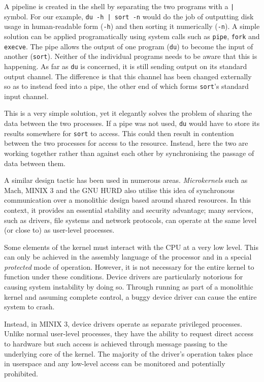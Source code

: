 A pipeline is created in the shell by separating the two programs with
a \texttt{|} symbol.  For our example, \texttt{du -h | sort -n} would
do the job of outputting disk usage in human-readable form
(\texttt{-h}) and then sorting it numerically (\texttt{-n}).  A simple
solution can be applied programatically using system calls such as
\texttt{pipe}, \texttt{fork} and \texttt{execve}.  The pipe allows the
output of one program (\texttt{du}) to become the input of another
(\texttt{sort}).  Neither of the individual programs needs to be aware
that this is happening.  As far as \texttt{du} is concerned, it is
still sending output on its standard output channel.  The difference
is that this channel has been changed externally so as to instead feed
into a pipe, the other end of which forms \texttt{sort}'s standard
input channel.

This is a very simple solution, yet it elegantly solves the problem of
sharing the data between the two processes.  If a pipe was not used,
\texttt{du} would have to store its results somewhere for \texttt{sort}
to access.  This could then result in contention between the two
processes for access to the resource.  Instead, here the two are
working together rather than against each other by synchronising the
passage of data between them.

A similar design tactic has been used in numerous areas.
\emph{Microkernels} such as Mach\cite{mach}, MINIX 3\cite{minix3} and
the GNU HURD\cite{hurd} also utilise this idea of synchronous
communication over a monolithic design based around shared resources.
In this context, it provides an essential stability and security
advantage; many services, such as drivers, file systems and network
protocols, can operate at the same level (or close to) as user-level
processes.

Some elements of the kernel must interact with the CPU at a very low
level.  This can only be achieved in the assembly language of the
processor and in a special \emph{protected} mode of operation.
However, it is not necessary for the entire kernel to function under
these conditions.  Device drivers are particularly notorious for
causing system instability by doing so.  Through running as part of a
monolithic kernel and assuming complete control, a buggy device driver
can cause the entire system to crash.

Instead, in MINIX 3, device drivers operate as separate privileged
processes.  Unlike normal user-level processes, they have the ability
to request direct access to hardware but such access is achieved
through message passing to the underlying core of the kernel.  The
majority of the driver's operation takes place in userspace and any
low-level access can be monitored and potentially prohibited.

